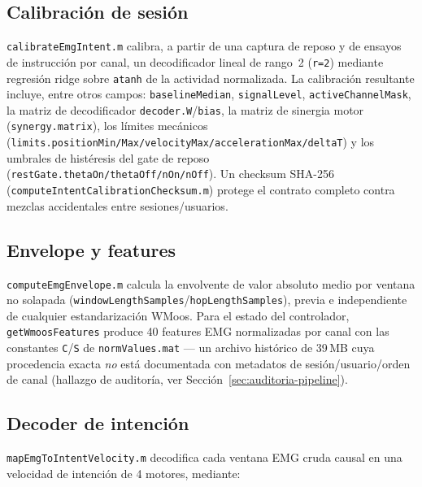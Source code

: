 \documentclass[11pt,a4paper]{article}
\begin{document}
\subsection{Calibración de sesión}

\texttt{calibrateEmgIntent.m} calibra, a partir de una captura de reposo y de ensayos
de instrucción por canal, un decodificador lineal de rango~2 (\texttt{r=2}) mediante
regresión ridge sobre \texttt{atanh} de la actividad normalizada. La calibración
resultante incluye, entre otros campos: \texttt{baselineMedian}, \texttt{signalLevel},
\texttt{activeChannelMask}, la matriz de decodificador \texttt{decoder.W}/\texttt{bias},
la matriz de sinergia motor (\texttt{synergy.matrix}), los límites mecánicos
(\texttt{limits.positionMin/Max/velocityMax/accelerationMax/deltaT}) y los umbrales de
histéresis del gate de reposo (\texttt{restGate.thetaOn/thetaOff/nOn/nOff}). Un checksum
SHA-256 (\texttt{computeIntentCalibrationChecksum.m}) protege el contrato completo contra
mezclas accidentales entre sesiones/usuarios.

\subsection{Envelope y features}

\texttt{computeEmgEnvelope.m} calcula la envolvente de valor absoluto medio por ventana
no solapada (\texttt{windowLengthSamples}/\texttt{hopLengthSamples}), previa e
independiente de cualquier estandarización WMoos. Para el estado del controlador,
\texttt{getWmoosFeatures} produce 40 features EMG normalizadas por canal con las
constantes \texttt{C}/\texttt{S} de \texttt{normValues.mat} --- un archivo histórico de
39\,MB cuya procedencia exacta \emph{no} está documentada con metadatos de
sesión/usuario/orden de canal (hallazgo de auditoría, ver Sección~\ref{sec:auditoria-pipeline}).

\subsection{Decoder de intención}

\texttt{mapEmgToIntentVelocity.m} decodifica cada ventana EMG cruda causal en una
velocidad de intención de 4 motores, mediante:
\end{document}

